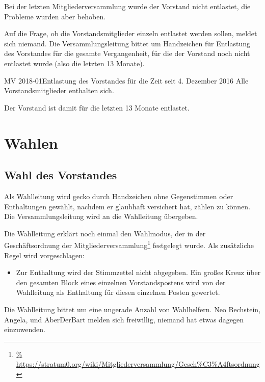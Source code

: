 \documentclass{s0minutes}
\begin{document}
Bei der letzten Mitgliederversammlung wurde der Vorstand nicht entlastet, die
Probleme wurden aber behoben.

Auf die Frage, ob die Vorstandsmitglieder einzeln entlastet werden sollen,
meldet sich niemand.  Die Versammlungsleitung bittet um Handzeichen für
Entlastung des Vorstandes für die gesamte Vergangenheit, für die der Vorstand
noch nicht entlastet wurde (also die letzten 13 Monate).

\begin{resolution}{MV 2018-01}{}{Entlastung des
  Vorstandes für die Zeit seit 4. Dezember 2016\hfill}{}
  Alle Vorstandsmitglieder enthalten sich.
\end{resolution}

Der Vorstand ist damit für die letzten 13 Monate entlastet.

\section{Wahlen}

\vspace{-.2cm}
\subsection{Wahl des Vorstandes}

Als Wahlleitung wird gecko durch Handzeichen ohne Gegenstimmen oder
Enthaltungen gewählt, nachdem er glaubhaft versichert hat, zählen zu können.
Die Versammlungsleitung wird an die Wahlleitung übergeben.

Die Wahlleitung erklärt noch einmal den Wahlmodus, der in der Geschäftsordnung
der Mitgliederversammlung\footnote{\url{%
https://stratum0.org/wiki/Mitgliederversammlung/Gesch\%C3\%A4ftsordnung}}
festgelegt wurde. Als zusätzliche Regel wird vorgeschlagen:

\begin{itemize}
  \item Zur Enthaltung wird der Stimmzettel nicht abgegeben. Ein großes Kreuz
    über den gesamten Block eines einzelnen Vorstandspostens wird von der
    Wahlleitung als Enthaltung für diesen einzelnen Posten gewertet.
\end{itemize}

Die Wahlleitung bittet um eine ungerade Anzahl von Wahlhelfern. Neo Bechstein,
Angela, und AberDerBart melden sich freiwillig, niemand hat etwas dagegen
einzuwenden.
\end{document}
